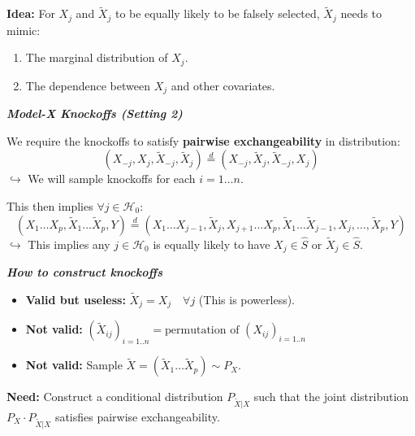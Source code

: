 \noindent \textbf{Idea:} For $X_j$ and $\tilde{X}_j$ to be equally likely to be falsely selected, $\tilde{X}_j$ needs to mimic:
\begin{enumerate}
    \item The marginal distribution of $X_j$.
    \item The dependence between $X_j$ and other covariates.
\end{enumerate}


\emph{\textbf{Model-X Knockoffs (Setting 2)}}

We require the knockoffs to satisfy \textbf{pairwise exchangeability} in distribution:
\[ (X_{-j}, X_j, \tilde{X}_{-j}, \tilde{X}_j) \stackrel{d}{=} (X_{-j}, \tilde{X}_j, \tilde{X}_{-j}, X_j) \]
$\hookrightarrow$ We will sample knockoffs for each $i = 1 \dots n$.

\vspace{0.2cm}
\noindent This then implies $\forall j \in \mathcal{H}_0$:
\[ (X_1 \dots X_p, \tilde{X}_1 \dots \tilde{X}_p, Y) \stackrel{d}{=} (X_1 \dots X_{j-1}, \tilde{X}_j, X_{j+1} \dots X_p, \tilde{X}_1 \dots \tilde{X}_{j-1}, X_j, \dots, \tilde{X}_p, Y) \]
$\hookrightarrow$ This implies any $j \in \mathcal{H}_0$ is equally likely to have $X_j \in \hat{S}$ or $\tilde{X}_j \in \hat{S}$. 

\emph{\textbf{How to construct knockoffs}}
\begin{itemize}
    \item \textbf{Valid but useless:} $\tilde{X}_j = X_j \quad \forall j$ (This is powerless).
    \item \textbf{Not valid:} $(\tilde{X}_{ij})_{i=1..n} = \text{permutation of } (X_{ij})_{i=1..n}$
    \item \textbf{Not valid:} Sample $\tilde{X} = (\tilde{X}_1 \dots \tilde{X}_p) \sim P_X$.
\end{itemize}

\noindent \textbf{Need:} Construct a conditional distribution $P_{\tilde{X}|X}$ such that the joint distribution $P_X \cdot P_{\tilde{X}|X}$ satisfies pairwise exchangeability.

